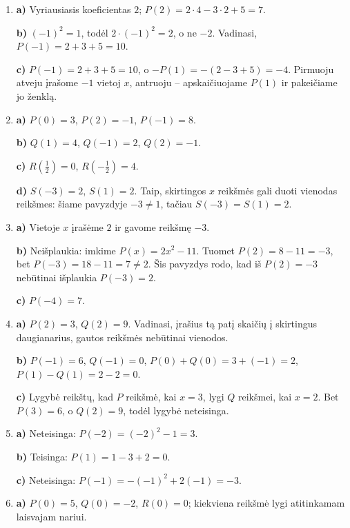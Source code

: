 \documentclass[12pt,a4paper]{exam}
\begin{document}
\begin{enumerate}
\textbf{a)} Ne: jei visi koeficientai lygūs nuliui, tai $a=0$, o tai prieštarauja kvadratinio daugianario apibrėžimui.

\textbf{b)} Taip: imkime $a=1$, $b=-1$, $c=3$. Tuomet $P(x)=x^2-x+3$, o $a$ ir $b$ yra priešingi skaičiai.
\item

\textbf{a)} Vyriausiasis koeficientas $2$; $P(2)=2\cdot4-3\cdot2+5=7$.

\textbf{b)} $(-1)^2=1$, todėl $2\cdot(-1)^2=2$, o ne $-2$. Vadinasi, $P(-1)=2+3+5=10$.

\textbf{c)} $P(-1)=2+3+5=10$, o $-P(1)=-(2-3+5)=-4$. Pirmuoju atveju įrašome $-1$ vietoj $x$, antruoju – apskaičiuojame $P(1)$ ir pakeičiame jo ženklą.
\item

\textbf{a)} $P(0)=3$, $P(2)=-1$, $P(-1)=8$.

\textbf{b)} $Q(1)=4$, $Q(-1)=2$, $Q(2)=-1$.

\textbf{c)} $R(\frac{1}{2})=0$, $R(-\frac{1}{2})=4$.

\textbf{d)} $S(-3)=2$, $S(1)=2$. Taip, skirtingos $x$ reikšmės gali duoti vienodas reikšmes: šiame pavyzdyje $-3\ne1$, tačiau $S(-3)=S(1)=2$.
\item

\textbf{a)} Vietoje $x$ įrašėme $2$ ir gavome reikšmę $-3$.

\textbf{b)} Neišplaukia: imkime $P(x)=2x^2-11$. Tuomet $P(2)=8-11=-3$, bet $P(-3)=18-11=7\ne2$. Šis pavyzdys rodo, kad iš $P(2)=-3$ nebūtinai išplaukia $P(-3)=2$.

\textbf{c)} $P(-4)=7$.
\item

\textbf{a)} $P(2)=3$, $Q(2)=9$. Vadinasi, įrašius tą patį skaičių į skirtingus daugianarius, gautos reikšmės nebūtinai vienodos.

\textbf{b)} $P(-1)=6$, $Q(-1)=0$, $P(0)+Q(0)=3+(-1)=2$, $P(1)-Q(1)=2-2=0$.

\textbf{c)} Lygybė reikštų, kad $P$ reikšmė, kai $x=3$, lygi $Q$ reikšmei, kai $x=2$. Bet $P(3)=6$, o $Q(2)=9$, todėl lygybė neteisinga.
\item

\textbf{a)} Neteisinga: $P(-2)=(-2)^2-1=3$.

\textbf{b)} Teisinga: $P(1)=1-3+2=0$.

\textbf{c)} Neteisinga: $P(-1)=-(-1)^2+2(-1)=-3$.
\item

\textbf{a)} $P(0)=5$, $Q(0)=-2$, $R(0)=0$; kiekviena reikšmė lygi atitinkamam laisvajam nariui.


\end{enumerate}
\end{document}
